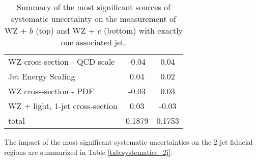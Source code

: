 \begin{table}[H]
\begin{tabular}{l|cc}
        WZ cross-section - QCD scale & -0.04 & 0.04 \\
        Jet Energy Scaling & 0.04 & 0.02 \\
        WZ cross-section - PDF & -0.03 & 0.03 \\
        WZ + light, 1-jet cross-section & 0.03 & -0.03 \\
        \hline
        total & 0.1879 & 0.1753 \\
        \hline\hline
    \end{tabular}
    \caption{Summary of the most significant sources of systematic uncertainty on the measurement of WZ + $b$ (top) and WZ + $c$ (bottom) with exactly one associated jet.}
    \label{tab:systematics_1j}
\end{table}





The impact of the most significant systematic uncertainties on the 2-jet fiducial regions are summarized in Table \ref{tab:systematics_2j}. 


